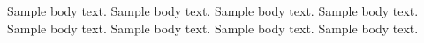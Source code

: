 Sample body text. Sample body text. Sample body text. Sample body text. Sample body text. Sample body text. Sample body text. Sample body text.
